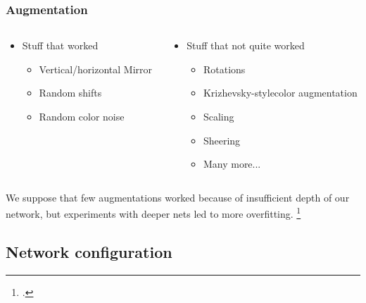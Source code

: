 \begin{frame}\frametitle{Augmentation}
\vspace{-2cm}
\begin{columns}[T]
\begin{column}{5cm}
\begin{itemize}
\item Stuff that worked
\begin{itemize}
\item Vertical/horizontal Mirror 
\item Random shifts
\item Random color noise
\end{itemize}
\end{itemize}

\end{column}
\begin{column}{5cm}
\begin{itemize}
\item Stuff that not quite worked
\begin{itemize}
\item Rotations
\item Krizhevsky-style\footnotemark color augmentation
\item Scaling
\item Sheering
\item Many more...
\end{itemize}
\end{itemize}
\end{column}
\end{columns}
\vspace{0.25cm}
\par We suppose that few augmentations worked because of insufficient depth of our network, but experiments with deeper nets led to more overfitting.
\footcitetext{KRIZ}
\end{frame}

\subsection{Network configuration}

